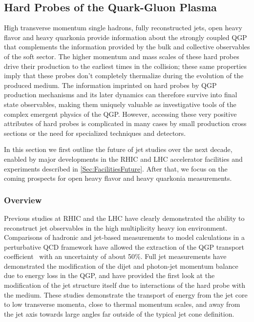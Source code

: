 \subsection{Hard Probes of the Quark-Gluon Plasma}
\label{Sec:HardProbes}

High transverse momentum single hadrons, fully reconstructed jets,
open heavy flavor and heavy quarkonia provide information about the
strongly coupled QGP that complements the information provided by the
bulk and collective observables of the soft sector.  The higher
momentum and mass scales of these hard probes drive their production
to the earliest times in the collision; these same properties imply
that these probes don't completely thermalize during the evolution of
the produced medium.  The information imprinted on hard probes by QGP
production mechanisms and its later dynamics can therefore survive
into final state observables, making them uniquely valuable as
investigative tools of the complex emergent physics of the QGP.
However, accessing these very positive attributes of hard probes is
complicated in many cases by small production cross sections or the
need for specialized techniques and detectors.

In this section we first outline the future of jet studies over the
next decade, enabled by major developments in the RHIC and LHC
accelerator facilities and experiments described in
\ref{Sec:FacilitiesFuture}.  After that, we focus on the coming
prospects for open heavy flavor and heavy quarkonia measurements.

\subsubsection{Overview}

Previous studies at RHIC and the LHC have clearly demonstrated the ability 
to reconstruct jet observables in the high multiplicity heavy ion environment. 
Comparisons of hadronic and jet-based measurements to model calculations 
in a perturbative QCD framework have allowed the extraction of the QGP transport coefficient  \qhat\
with an uncertainty of about 50\%. Full jet 
measurements have demonstrated the modification of the dijet and photon-jet
momentum balance due to energy loss in the QGP, and have provided 
the first look at the modification of the jet structure itself due to 
interactions of the hard probe with the medium. These studies demonstrate the 
transport of energy from the jet core to low transverse momenta, close 
to thermal momentum scales, and away from the jet axis towards 
large angles far outside of the typical jet cone definition.

